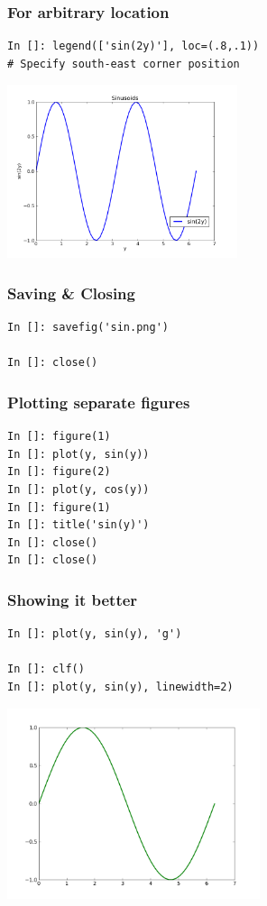 \documentclass[14pt,compress]{beamer}
\begin{document}
\begin{frame}[fragile]
  \frametitle{For arbitrary location}
\vspace*{-0.1in}
\begin{lstlisting}
In []: legend(['sin(2y)'], loc=(.8,.1)) 
# Specify south-east corner position
\end{lstlisting}
\begin{center}
  \includegraphics[height=2in, interpolate=true]{data/loc}  
\end{center}
\end{frame}

\begin{frame}[fragile]
\frametitle{Saving \& Closing}
\begin{lstlisting}
In []: savefig('sin.png')

In []: close()
\end{lstlisting}
\end{frame}

\begin{frame}[fragile]
\frametitle{Plotting separate figures}
\begin{lstlisting}
In []: figure(1)
In []: plot(y, sin(y))
In []: figure(2)
In []: plot(y, cos(y))
In []: figure(1)
In []: title('sin(y)')
In []: close()
In []: close()
\end{lstlisting}
\end{frame}

\begin{frame}[fragile]
\frametitle{Showing it better}
\vspace{-0.15in}
\begin{lstlisting}
In []: plot(y, sin(y), 'g')

In []: clf()
In []: plot(y, sin(y), linewidth=2)
\end{lstlisting}
\vspace*{-0.2in}
\begin{center}
  \includegraphics[height=2.2in, interpolate=true]{data/green}  
\end{center}
\end{frame}
\end{document}
